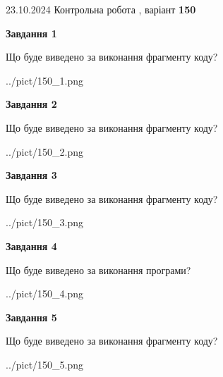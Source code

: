 \documentclass[12pt, ukrainian]{article}
\begin{document}
{\Large{23.10.2024 Контрольна робота , варіант  \No \textbf { 150 }\par}}
{
\begin {large}
{\begin {center}\textbf{Завдання 1}\end {center}}

Що буде виведено за виконання фрагменту коду?\par
\begin{center}
	{../pict/150_1.png}
\end{center}
\newpage

{\begin {center}\textbf{Завдання 2}\end {center}}

Що буде виведено за виконання фрагменту коду?\par
\begin{center}
	{../pict/150_2.png}
\end{center}
\newpage

{\begin {center}\textbf{Завдання 3}\end {center}}

Що буде виведено за виконання фрагменту коду?\par
\begin{center}
	{../pict/150_3.png}
\end{center}
\newpage

{\begin {center}\textbf{Завдання 4}\end {center}}

Що буде виведено за виконання програми?\par
\begin{center}
	{../pict/150_4.png}
\end{center}
\newpage

{\begin {center}\textbf{Завдання 5}\end {center}}

Що буде виведено за виконання фрагменту коду?\par
\begin{center}
	{../pict/150_5.png}
\end{center}
\newpage


\end{large}}
\end{document}
